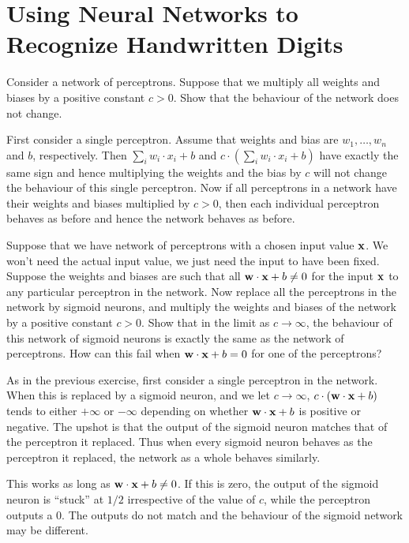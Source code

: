\chapter{Using Neural Networks to Recognize Handwritten Digits}

\begin{exercise} Consider a network of perceptrons. Suppose that
we multiply all weights and biases by a positive constant $c > 0$. Show 
that the behaviour of the network does not change.
\end{exercise}
\begin{solution}
First consider a single perceptron. Assume that weights and bias are $w_1,
\ldots, w_n$ and $b$, respectively. Then $\sum_i w_i \cdot x_i + b$ and $c
\cdot (\sum_i w_i \cdot x_i + b)$ have exactly the same sign and hence
multiplying the weights and the bias by $c$ will not change the behaviour of
this single perceptron. Now if all perceptrons in a network have their weights
and biases multiplied by $c > 0$, then each individual perceptron behaves as
before and hence the network behaves as before.  
\end{solution}

\begin{exercise}
Suppose that we have network of perceptrons with a chosen input value
$\mathbf{x}$. We won’t need the actual input value, we just need the input to
have been fixed. Suppose the weights and biases are such that all $\mathbf{w}
\cdot \mathbf{x} + b \neq 0$ for the input $\mathbf{x}$ to any particular
perceptron in the network. Now replace all the perceptrons in the network by
sigmoid neurons, and multiply the weights and biases of the network by a
positive constant $c > 0$. Show that in the limit as $c \to \infty$, the 
behaviour of this network of sigmoid neurons is exactly the same as the network
of perceptrons. How can this fail when $\mathbf{w} \cdot \mathbf{x} + b = 0$ for
one of the perceptrons?
\end{exercise}
\begin{solution}
As in the previous exercise, first consider a single perceptron in the network. 
When this is replaced by a sigmoid neuron, and we let $c \to \infty$, 
$c \cdot (\mathbf{w} \cdot \mathbf{x} + b)$ tends to either $+ \infty$ or $- \infty$
depending on whether $\mathbf{w} \cdot \mathbf{x} + b$ is positive or negative. The 
upshot is that the output of the sigmoid neuron matches that of the perceptron 
it replaced. Thus when every sigmoid neuron behaves as the perceptron it replaced, 
the network as a whole behaves similarly. 

This works as long as $\mathbf{w} \cdot \mathbf{x} + b \neq 0$. If this is zero, the 
output of the sigmoid neuron is ``stuck'' at $1/2$ irrespective of the value of $c$, 
while the perceptron outputs a $0$. The outputs do not match and the behaviour 
of the sigmoid network may be different. 
\end{solution}
